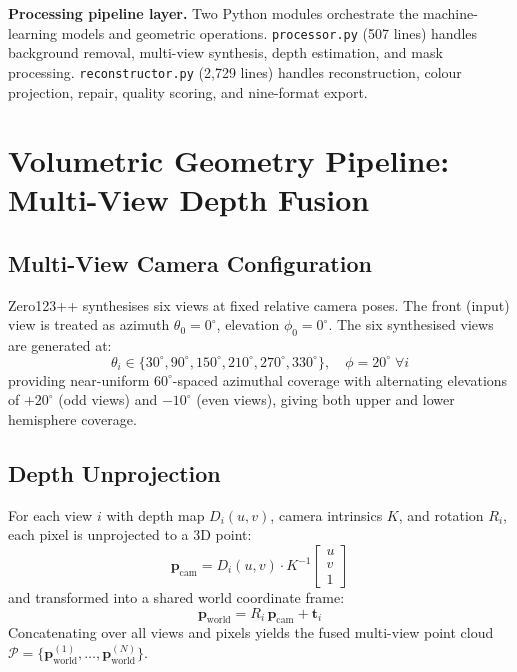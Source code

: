 ﻿\documentclass[conference]{IEEEtran}
\begin{document}
\textbf{Processing pipeline layer.} Two Python modules orchestrate the machine-learning models and geometric
operations. \texttt{processor.py} (507 lines) handles background removal, multi-view synthesis, depth estimation,
and mask processing. \texttt{reconstructor.py} (2,729 lines) handles reconstruction, colour projection, repair,
quality scoring, and nine-format export.

\section{Volumetric Geometry Pipeline: Multi-View Depth Fusion}

\subsection{Multi-View Camera Configuration}

Zero123++ synthesises six views at fixed relative camera poses. The front (input) view is treated as azimuth
$\theta_0 = 0^\circ$, elevation $\phi_0 = 0^\circ$. The six synthesised views are generated at:
\begin{equation}
\theta_i \in \{30^\circ, 90^\circ, 150^\circ, 210^\circ, 270^\circ, 330^\circ\}, \quad \phi = 20^\circ \; \forall i
\label{eq:azimuths}
\end{equation}
providing near-uniform $60^\circ$-spaced azimuthal coverage with alternating elevations of $+20^\circ$ (odd views) and $-10^\circ$ (even views), giving both upper and lower hemisphere coverage.

\subsection{Depth Unprojection}

For each view $i$ with depth map $D_i(u, v)$, camera intrinsics $K$, and rotation $R_i$, each pixel is
unprojected to a 3D point:
\begin{equation}
\mathbf{p}_{\text{cam}} = D_i(u,v) \cdot K^{-1} \begin{bmatrix} u \\ v \\ 1 \end{bmatrix}
\label{eq:unproject}
\end{equation}
and transformed into a shared world coordinate frame:
\begin{equation}
\mathbf{p}_{\text{world}} = R_i \, \mathbf{p}_{\text{cam}} + \mathbf{t}_i
\label{eq:world}
\end{equation}
Concatenating over all views and pixels yields the fused multi-view point cloud
$\mathcal{P} = \{\mathbf{p}^{(1)}_{\text{world}}, \ldots, \mathbf{p}^{(N)}_{\text{world}}\}$.
\end{document}
